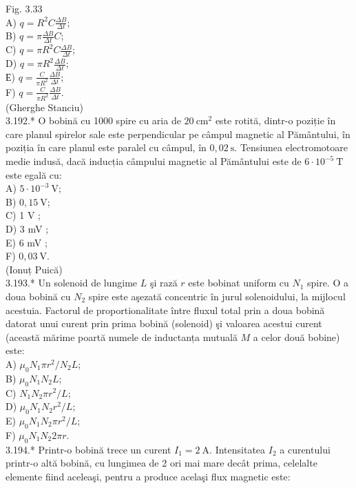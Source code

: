 \documentclass[10pt]{article}
\begin{document}
Fig. 3.33\\
A) $q=R^{2} C \frac{\Delta B}{\Delta t}$;\\
B) $q=\pi \frac{\Delta B}{\Delta t} C$;\\
C) $q=\pi R^{2} C \frac{\Delta B}{\Delta t}$;\\
D) $q=\pi R^{2} \frac{\Delta B}{\Delta t}$;\\
Е) $q=\frac{C}{\pi R^{2}} \frac{\Delta B}{\Delta t}$;\\
F) $q=\frac{C}{\pi R^{2}} \frac{\Delta B}{\Delta t}$.\\
(Gherghe Stanciu)\\
3.192.* O bobină cu 1000 spire cu aria de $20 \mathrm{~cm}^{2}$ este rotită, dintr-o poziție în care planul spirelor sale este perpendicular pe câmpul magnetic al Pământului, în poziția în care planul este paralel cu câmpul, în $0,02 \mathrm{~s}$. Tensiunea electromotoare medie indusă, dacă inducția câmpului magnetic al Pământului este de $6 \cdot 10^{-5} \mathrm{~T}$ este egală cu:\\
A) $5 \cdot 10^{-3} \mathrm{~V}$;\\
B) $0,15 \mathrm{~V}$;\\
C) 1 V ;\\
D) 3 mV ;\\
E) 6 mV ;\\
F) $0,03 \mathrm{~V}$.\\
(Ionuț Puică)\\
3.193.* Un solenoid de lungime $L$ şi rază $r$ este bobinat uniform cu $N_{1}$ spire. O a doua bobină cu $N_{2}$ spire este aşezată concentric în jurul solenoidului, la mijlocul acestuia. Factorul de proportionalitate între fluxul total prin a doua bobină datorat unui curent prin prima bobină (solenoid) şi valoarea acestui curent (această mărime poartă numele de inductanța mutuală $M$ a celor două bobine) este:\\
A) $\mu_{0} N_{1} \pi r^{2} / N_{2} L$;\\
B) $\mu_{0} N_{1} N_{2} L$;\\
C) $N_{1} N_{2} \pi r^{2} / L$;\\
D) $\mu_{0} N_{1} N_{2} r^{2} / L$;\\
E) $\mu_{0} N_{1} N_{2} \pi r^{2} / L$;\\
F) $\mu_{0} N_{1} N_{2} 2 \pi r$.\\
3.194.* Printr-o bobină trece un curent $I_{1}=2 \mathrm{~A}$. Intensitatea $I_{2}$ a curentului printr-o altă bobină, cu lungimea de 2 ori mai mare decât prima, celelalte elemente fiind aceleaşi, pentru a produce acelaşi flux magnetic este:\\
\end{document}
